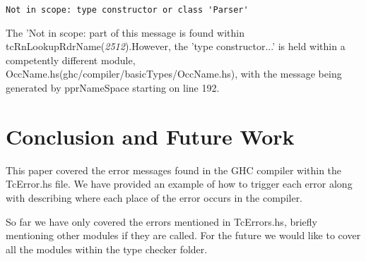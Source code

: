 \documentclass[a4paper]{article}
\begin{document}
\begin{lstlisting}[label={lst: T23.0.2}, numbers=none, caption={Error}]
Not in scope: type constructor or class 'Parser'
\end{lstlisting}

The 'Not in scope: part of this message is found within tcRnLookupRdrName(\textit{2512}).However, the 'type constructor...' is held within a competently different module, OccName.hs(ghc/compiler/basicTypes/OccName.hs), with the message being generated by pprNameSpace starting on line 192.


\section{Conclusion and Future Work}

This paper covered the error messages found in the GHC compiler within the TcError.hs file. We have provided an example of how to trigger each error along with describing where each place of the error occurs in the compiler.

So far we have only covered the errors mentioned in TcErrors.hs, briefly mentioning other modules if they are called. For the future we would like to cover all the modules within the type checker folder.




\end{document}
